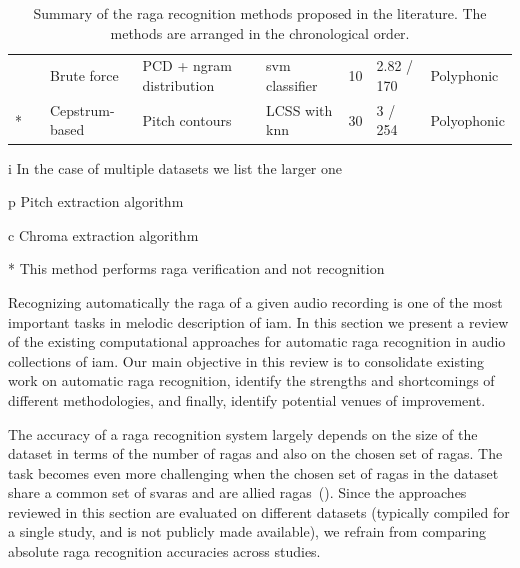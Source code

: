 \begin{table}
\begin{threeparttable}
\begin{centering}
\begin{tabular}{l l P{2cm} P{3cm} P{2.5cm} L{1cm} P{1.5cm} P{2cm}}
				\cite{kumar2014identifying} & \cite{Salamon2012} & Brute force & PCD + \acrshort{ngram} distribution & \acrshort{svm} classifier  & 10 & 2.82 / 170 & Polyphonic\tabularnewline
				\cite{shrey_ISMIR_2015}{*} & \cite{Salamon2012} & Cepstrum-based & Pitch contours & LCSS with \acrshort{knn} & 30 & 3 / 254 & Polyophonic\tabularnewline
				\hline 
			\end{tabular}
			\par \end{centering}
		\begin{tablenotes}
			\item[i] In the case of multiple datasets we list the larger one
			\item[p] Pitch extraction algorithm
			\item[c] Chroma extraction algorithm
			\item[*] This method performs \gls{raga} verification and not recognition
		\end{tablenotes}
		\caption[Summary of the existing \gls{raga} recognition methods]{Summary of the \Gls{raga} recognition methods proposed in the literature. The methods are arranged in the chronological order. }
		\label{tab:raga_recognition_methods_details}
	\end{threeparttable}
\end{table}

Recognizing automatically the \gls{raga} of a given audio recording is one of the most important tasks in melodic description of \gls{iam}. In this section we present a review of the existing computational approaches for automatic \gls{raga} recognition in audio collections of \gls{iam}. Our main objective in this review is to consolidate existing work on automatic \gls{raga} recognition, identify the strengths and shortcomings of different methodologies, and finally, identify potential venues of improvement.

The accuracy of a \gls{raga} recognition system largely depends on the size of the dataset in terms of the number of \glspl{raga} and also on the chosen set of \glspl{raga}. The task becomes even more challenging when the chosen set of \glspl{raga} in the dataset share a common set of \glspl{svara} and are allied \glspl{raga}~(). Since the approaches reviewed in this section are evaluated on different datasets (typically compiled for a single study, and is not publicly made available), we refrain from comparing absolute \gls{raga} recognition accuracies across studies. 

